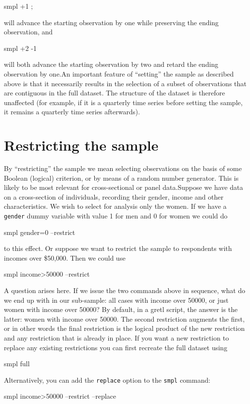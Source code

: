 \begin{code}
    smpl +1 ;
\end{code}

will advance the starting observation by one while preserving the
ending observation, and

\begin{code}
    smpl +2 -1
\end{code}

will both advance the starting observation by two and retard the
ending observation by one.An important feature of ``setting'' the
sample as described above is that it necessarily results in the
selection of a subset of observations that are contiguous in the full
dataset. The structure of the dataset is therefore unaffected (for
example, if it is a quarterly time series before setting the sample,
it remains a quarterly time series afterwards).

\section{Restricting the sample}
\label{sample-restrict}

By ``restricting'' the sample we mean selecting observations on the
basis of some Boolean (logical) criterion, or by means of a random
number generator.  This is likely to be most relevant for
cross-sectional or panel data.Suppose we have data on a cross-section
of individuals, recording their gender, income and other
characteristics.  We wish to select for analysis only the women.  If
we have a \verb+gender+ dummy variable with value 1 for men and 0 for
women we could do
%      
\begin{code}
    smpl gender=0 --restrict
\end{code}
%
to this effect.  Or suppose we want to restrict the sample to
respondents with incomes over \$50,000.  Then we could use
%
\begin{code}
    smpl income>50000 --restrict
\end{code}

A question arises here.  If we issue the two commands above in
sequence, what do we end up with in our sub-sample: all cases with
income over 50000, or just women with income over 50000? By default,
in a gretl script, the answer is the latter: women with income over
50000.  The second restriction augments the first, or in other words
the final restriction is the logical product of the new restriction
and any restriction that is already in place.  If you want a new
restriction to replace any existing restrictions you can first
recreate the full dataset using
%
\begin{code}
    smpl full
\end{code}
%
Alternatively, you can add the \verb+replace+ option to the
\verb+smpl+ command:
%
\begin{code}
    smpl income>50000 --restrict --replace
\end{code}

